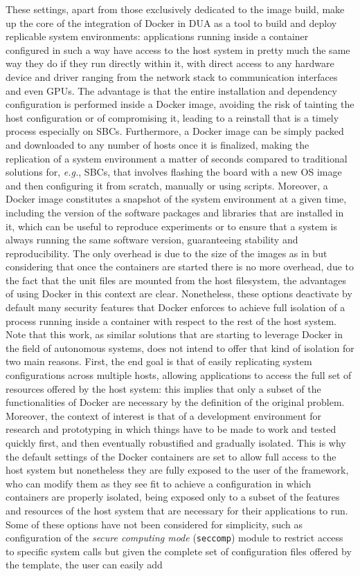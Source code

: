 These settings, apart from those exclusively dedicated to the image build, make up the core of the integration of Docker in DUA as a tool to build and deploy replicable system environments: applications running inside a container configured in such a way have access to the host system in pretty much the same way they do if they run directly within it, with direct access to any hardware device and driver ranging from the network stack to communication interfaces and even GPUs. The advantage is that the entire installation and dependency configuration is performed inside a Docker image, avoiding the risk of tainting the host configuration or of compromising it, leading to a reinstall that is a timely process especially on SBCs. Furthermore, a Docker image can be simply packed and downloaded to any number of hosts once it is finalized, making the replication of a system environment a matter of seconds compared to traditional solutions for, \emph{e.g.}, SBCs, that involves flashing the board with a new OS image and then configuring it from scratch, manually or using scripts. Moreover, a Docker image constitutes a snapshot of the system environment at a given time, including the version of the software packages and libraries that are installed in it, which can be useful to reproduce experiments or to ensure that a system is always running the same software version, guaranteeing stability and reproducibility. The only overhead is due to the size of the images as in  but considering that once the containers are started there is no more overhead, due to the fact that the unit files are mounted from the host filesystem, the advantages of using Docker in this context are clear. Nonetheless, these options deactivate by default many security features that Docker enforces to achieve full isolation of a process running inside a container with respect to the rest of the host system. Note that this work, as similar solutions that are starting to leverage Docker in the field of autonomous systems, does not intend to offer that kind of isolation for two main reasons. First, the end goal is that of easily replicating system configurations across multiple hosts, allowing applications to access the full set of resources offered by the host system: this implies that only a subset of the functionalities of Docker are necessary by the definition of the original problem. Moreover, the context of interest is that of a development environment for research and prototyping in which things have to be made to work and tested quickly first, and then eventually robustified and gradually isolated. This is why the default settings of the Docker containers are set to allow full access to the host system but nonetheless they are fully exposed to the user of the framework, who can modify them as they see fit to achieve a configuration in which containers are properly isolated, being exposed only to a subset of the features and resources of the host system that are necessary for their applications to run. Some of these options have not been considered for simplicity, such as configuration of the \emph{secure computing mode} (\texttt{seccomp}) module to restrict access to specific system calls but given the complete set of configuration files offered by the template, the user can easily add 
